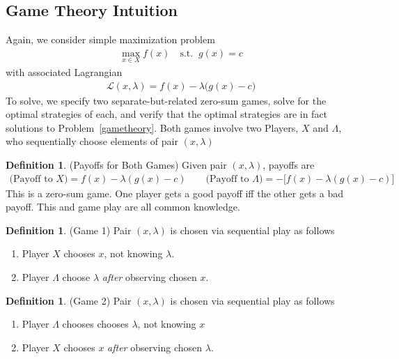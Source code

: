 \documentclass[12pt]{book}
\numberwithin{equation}{section} %
\theoremstyle{plain}
\theoremstyle{definition}
\newtheorem{defn}[thm]{Definition}
\theoremstyle{remark}
\newcommand{\sL}{\mathscr{L}}
\begin{document}
\subsection{Game Theory Intuition}

Again, we consider simple maximization problem
\begin{align}
  \max_{x\in X} f(x)
  \quad \text{s.t.}\;\; g(x) = c
  \label{gametheory}
\end{align}
with associated Lagrangian
\begin{align}
  \sL(x,\lambda)
  = f(x) - \lambda \big(g(x)-c\big)
  \label{gametheorylagrange}
\end{align}
To solve, we specify two separate-but-related zero-sum games, solve for
the optimal strategies of each, and verify that the optimal strategies
are in fact solutions to Problem~\ref{gametheory}.  Both games involve
two Players, $X$ and $\Lambda$, who sequentially choose elements of pair
$(x,\lambda)$

\begin{defn}(Payoffs for Both Games)
Given pair $(x,\lambda)$, payoffs are
\begin{align*}
  \text{(Payoff to $X$)}
  = f(x) - \lambda(g(x)-c)
  \qquad
  \text{(Payoff to $\Lambda$)}
  = -\big[f(x) - \lambda(g(x)-c)\big]
\end{align*}
This is a zero-sum game. One player gets a good payoff iff the other
gets a bad payoff. This and game play are all common knowledge.
\end{defn}

\begin{defn}(Game 1)
Pair $(x,\lambda)$ is chosen via sequential play as follows
\begin{enumerate}
  \item Player $X$ chooses $x$, not knowing $\lambda$.
  \item Player $\Lambda$ choose $\lambda$ \emph{after} observing chosen
    $x$.
\end{enumerate}
\end{defn}

\begin{defn}(Game 2)
Pair $(x,\lambda)$ is chosen via sequential play as follows
\begin{enumerate}
  \item Player $\Lambda$ chooses chooses $\lambda$, not knowing $x$
  \item Player $X$ chooses $x$ \emph{after} observing chosen $\lambda$.
\end{enumerate}
\end{defn}
\end{document}
